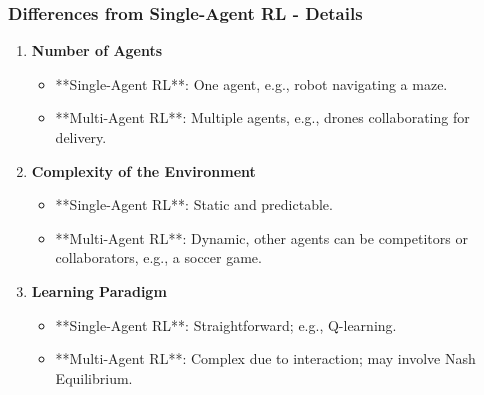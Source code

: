 \documentclass[aspectratio=169]{beamer}
\begin{document}
\begin{frame}[fragile]
    \frametitle{Differences from Single-Agent RL - Details}
    \begin{enumerate}
        \item \textbf{Number of Agents}
            \begin{itemize}
                \item **Single-Agent RL**: One agent, e.g., robot navigating a maze.
                \item **Multi-Agent RL**: Multiple agents, e.g., drones collaborating for delivery.
            \end{itemize}
        
        \item \textbf{Complexity of the Environment}
            \begin{itemize}
                \item **Single-Agent RL**: Static and predictable.
                \item **Multi-Agent RL**: Dynamic, other agents can be competitors or collaborators, e.g., a soccer game.
            \end{itemize}
        
        \item \textbf{Learning Paradigm}
            \begin{itemize}
                \item **Single-Agent RL**: Straightforward; e.g., Q-learning.
                \item **Multi-Agent RL**: Complex due to interaction; may involve Nash Equilibrium.
            \end{itemize}
    \end{enumerate}
\end{frame}
\end{document}
